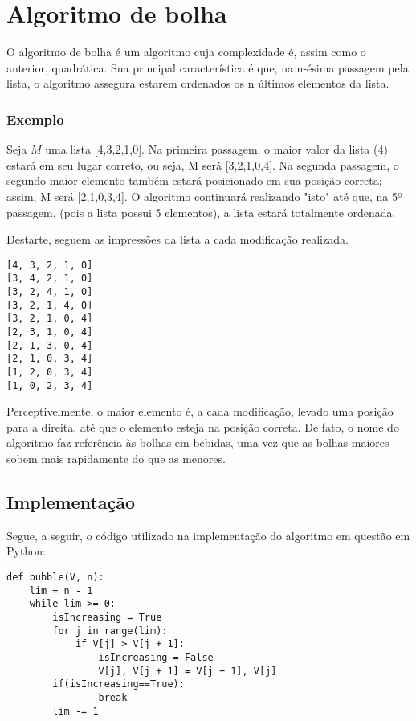 \section{Algoritmo de bolha}
O algoritmo de bolha é um algoritmo cuja complexidade é, assim como o anterior, quadrática. Sua principal característica é que, na n-ésima passagem pela lista, o algoritmo assegura estarem ordenados os n últimos elementos da lista.

\subsubsection*{Exemplo}
Seja $M$ uma lista [4,3,2,1,0].
Na primeira passagem, o maior valor da lista (4) estará em seu lugar correto, ou seja, M será [3,2,1,0,4]. Na segunda passagem, o segundo maior elemento também estará posicionado em sua posição correta; assim, M será [2,1,0,3,4].
O algoritmo continuará realizando "isto" até que, na 5º passagem, (pois a lista possui 5 elementos), a lista estará totalmente ordenada.

Destarte, seguem as impressões da lista a cada modificação realizada. 

\begin{lstlisting}
[4, 3, 2, 1, 0]
[3, 4, 2, 1, 0]
[3, 2, 4, 1, 0]
[3, 2, 1, 4, 0]
[3, 2, 1, 0, 4]
[2, 3, 1, 0, 4]
[2, 1, 3, 0, 4]
[2, 1, 0, 3, 4]
[1, 2, 0, 3, 4]
[1, 0, 2, 3, 4]
\end{lstlisting}

Perceptivelmente, o maior elemento é, a cada modificação, levado uma posição para a direita, até que o elemento esteja na posição correta. De fato, o nome do algoritmo faz referência às bolhas em bebidas, uma vez que as bolhas maiores sobem mais rapidamente do que as menores.

\subsection{Implementação}
Segue, a seguir, o código utilizado na implementação do algoritmo em questão em Python:

\begin{lstlisting}
def bubble(V, n):
    lim = n - 1
    while lim >= 0:
        isIncreasing = True
        for j in range(lim):
            if V[j] > V[j + 1]:
                isIncreasing = False
                V[j], V[j + 1] = V[j + 1], V[j]
        if(isIncreasing==True): 
                break
        lim -= 1
\end{lstlisting}


